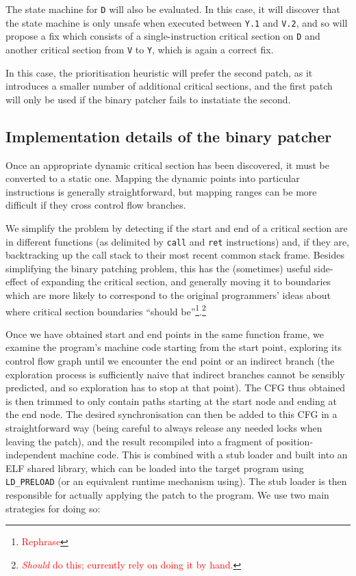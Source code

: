 \documentclass[10pt,twocolumn,preprint,natbib,authoryear]{sigplanconf}
\newcommand{\editorial}[1]{\textcolor{red}{\footnote{\textcolor{red}{#1}}}}
\begin{document}
The state machine for \verb|D| will also be evaluated.  In this case,
it will discover that the state machine is only unsafe when executed
between \verb|Y.1| and \verb|V.2|, and so will propose a fix which
consists of a single-instruction critical section on \verb|D| and
another critical section from \verb|V| to \verb|Y|, which is again a
correct fix.

In this case, the prioritisation heuristic will prefer the second
patch, as it introduces a smaller number of additional critical
sections, and the first patch will only be used if the binary patcher
fails to instatiate the second.


\subsection{Implementation details of the binary patcher}

Once an appropriate dynamic critical section has been discovered, it
must be converted to a static one.  Mapping the dynamic points into
particular instructions is generally straightforward, but mapping
ranges can be more difficult if they cross control flow branches.

We simplify the problem by detecting if the start and end of a
critical section are in different functions (as delimited by
\verb|call| and \verb|ret| instructions) and, if they are,
backtracking up the call stack to their most recent common stack
frame.  Besides simplifying the binary patching problem, this has the
(sometimes) useful side-effect of expanding the critical section, and
generally moving it to boundaries which are more likely to correspond
to the original programmers' ideas about where critical section
boundaries ``should be''\editorial{Rephrase}.\editorial{\emph{Should}
  do this; currently rely on doing it by hand.}

Once we have obtained start and end points in the same function frame,
we examine the program's machine code starting from the start point,
exploring its control flow graph until we encounter the end point or
an indirect branch (the exploration process is sufficiently naive that
indirect branches cannot be sensibly predicted, and so exploration has
to stop at that point).  The CFG thus obtained is then trimmed to only
contain paths starting at the start node and ending at the end node.
The desired synchronisation can then be added to this CFG in a
straightforward way (being careful to always release any needed locks
when leaving the patch), and the result recompiled into a fragment of
position-independent machine code.  This is combined with a stub
loader and built into an ELF shared library, which can be loaded into
the target program using \verb|LD_PRELOAD| (or an equivalent runtime
mechanism using).  The stub loader is then responsible for actually
applying the patch to the program.  We use two main strategies for
doing so:
\end{document}
